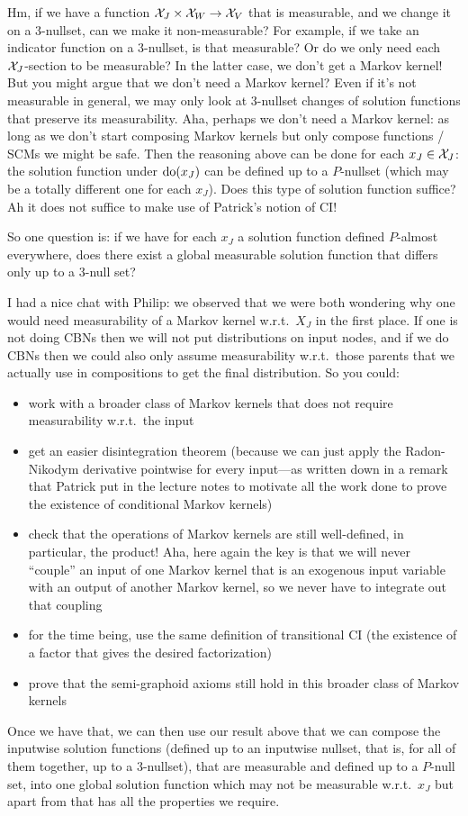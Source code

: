 {  Hm, if we have a function $\mathcal{X}_J \times \mathcal{X}_W \to \mathcal{X}_V$ that is measurable, and we change it on a
  3-nullset, can we make it non-measurable? For example, if we take an indicator function on a 3-nullset,
  is that measurable? Or do we only need each $\mathcal{X}_J$-section to be measurable? In the latter case,
  we don't get a Markov kernel! But you might argue that we don't need a Markov kernel?
  Even if it's not measurable in general, we may only look at 3-nullset changes of solution functions that 
  preserve its measurability.
  Aha, perhaps we don't need a Markov kernel: as long as we don't start composing Markov kernels but only
  compose functions / SCMs we might be safe.
  Then the reasoning above can be done for each $x_J \in \mathcal{X}_J$: the solution function under $\operatorname{do}(x_J)$
  can be defined up to a $P$-nullset (which may be a totally different one for each $x_J$). Does this 
  type of solution function suffice? Ah it does not suffice to make use of Patrick's notion of CI!

  So one question is: if we have for each $x_J$ a solution function defined $P$-almost everywhere, 
  does there exist a global measurable solution function that differs only up to a 3-null set?

  I had a nice chat with Philip: we observed that we were both wondering why one would need 
  measurability of a Markov kernel w.r.t.\ $X_J$ in the first place. If one is not doing CBNs
  then we will not put distributions on input nodes, and if we do CBNs then we could also 
  only assume measurability w.r.t.\ those parents that we actually use in compositions to get
  the final distribution. So you could:
  \begin{itemize}
    \item work with a broader class of Markov kernels that does not require measurability w.r.t.\ the input
    \item get an easier disintegration theorem (because we can just apply the Radon-Nikodym derivative pointwise for every input---as written down in a remark that Patrick put in the lecture notes to motivate all the work done to prove the existence of conditional Markov kernels)
    \item check that the operations of Markov kernels are still well-defined, in particular, the product! Aha, here again the key is that we will never ``couple'' an input of one Markov kernel that is an exogenous input variable with an output of another Markov kernel, so we never have to integrate out that coupling
    \item for the time being, use the same definition of transitional CI (the existence of a factor that gives the desired factorization) 
    \item prove that the semi-graphoid axioms still hold in this broader class of Markov kernels
  \end{itemize}
  Once we have that, we can then use our result above that we can compose the inputwise solution functions (defined up to an inputwise nullset, that is, for all of them together, up to a 3-nullset),
  that are measurable and defined up to a $P$-null set, into one global solution function which may not be measurable w.r.t.\ $x_J$ but apart from that has all the properties we require.
  
}
